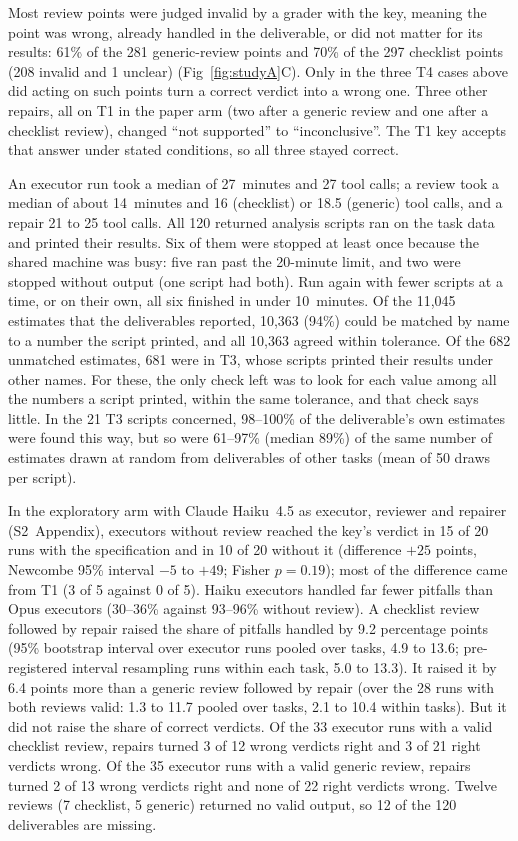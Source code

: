 \documentclass[10pt,letterpaper]{article}
\begin{document}
Most review points were judged invalid by a grader with the key, meaning
the point was wrong, already handled in the deliverable, or did not
matter for its results: 61\% of the 281 generic-review points and 70\% of
the 297 checklist points (208 invalid and 1 unclear)
(Fig~\ref{fig:studyA}C). Only in the three T4 cases above did acting on
such points turn a correct verdict into a wrong one. Three other repairs,
all on T1 in the paper arm (two after a generic review and one after a
checklist review), changed ``not supported'' to ``inconclusive''. The T1
key accepts that answer under stated conditions, so all three stayed
correct.

An executor run took a median of 27~minutes and 27 tool calls; a review
took a median of about 14~minutes and 16 (checklist) or 18.5 (generic)
tool calls, and a repair 21 to 25 tool calls.
All 120 returned analysis scripts ran on the task data and printed their
results. Six of them were stopped at least once because the shared
machine was busy: five ran past the 20-minute limit, and two were stopped
without output (one script had both). Run again with fewer scripts at a
time, or on their own, all six finished in under 10~minutes. Of the
11,045 estimates that the deliverables reported, 10,363 (94\%) could be matched by name to a number
the script printed, and all 10,363 agreed within tolerance. Of the 682
unmatched estimates, 681 were in T3, whose scripts printed their results
under other names. For these, the only check left was to look for each
value among all the numbers a script printed, within the same tolerance,
and that check says little. In the 21 T3 scripts concerned, 98--100\% of
the deliverable's own estimates were found this way, but so were
61--97\% (median 89\%) of the same number of estimates drawn at random
from deliverables of other tasks (mean of 50 draws per script).

In the exploratory arm with Claude Haiku~4.5 as executor, reviewer and
repairer (S2~Appendix), executors without review reached the key's verdict
in 15 of 20 runs with the specification and in 10 of 20 without it
(difference $+25$ points, Newcombe 95\% interval $-5$ to $+49$; Fisher
$p = 0.19$); most of the difference came from T1 (3 of 5 against 0 of 5).
Haiku executors handled far fewer pitfalls than Opus executors (30--36\%
against 93--96\% without review). A checklist review followed by repair
raised the share of pitfalls handled by 9.2 percentage points (95\%
bootstrap interval over executor runs pooled over tasks, 4.9 to 13.6;
pre-registered interval resampling runs within each task, 5.0 to 13.3).
It raised it by 6.4 points more than a generic review followed by repair
(over the 28 runs with both reviews valid: 1.3 to 11.7 pooled over tasks,
2.1 to 10.4 within tasks). But it did not
raise the share of correct verdicts. Of the 33 executor runs with a valid
checklist review, repairs turned 3 of 12 wrong verdicts right and 3 of 21
right verdicts wrong. Of the 35 executor runs with a valid generic review,
repairs turned 2 of 13 wrong verdicts right and none of 22 right verdicts
wrong. Twelve reviews (7 checklist, 5 generic) returned no valid output,
so 12 of the 120 deliverables are missing.
\end{document}
